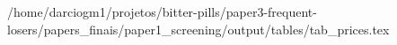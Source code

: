 /home/darciogm1/projetos/bitter-pills/paper3-frequent-losers/papers_finais/paper1_screening/output/tables/tab_prices.tex